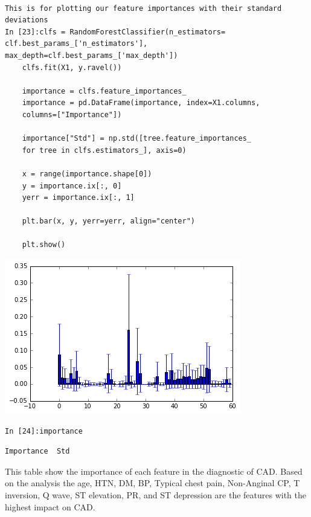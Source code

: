 \documentclass[sigconf]{acmart}
\begin{document}
\begin{lstlisting}

This is for plotting our feature importances with their standard deviations
In [23]:clfs = RandomForestClassifier(n_estimators= clf.best_params_['n_estimators'],
max_depth=clf.best_params_['max_depth'])
    clfs.fit(X1, y.ravel())

    importance = clfs.feature_importances_
    importance = pd.DataFrame(importance, index=X1.columns, 
    columns=["Importance"])

    importance["Std"] = np.std([tree.feature_importances_
    for tree in clfs.estimators_], axis=0)

    x = range(importance.shape[0])
    y = importance.ix[:, 0]
    yerr = importance.ix[:, 1]

    plt.bar(x, y, yerr=yerr, align="center")

    plt.show()
\end{lstlisting}
\includegraphics[width=0.95\columnwidth]{images/output_17_0.png}

\begin{lstlisting}
In [24]:importance
\end{lstlisting}



\begin{lstlisting}
Importance	Std
\end{lstlisting}


This table show the importance of each feature in the diagnostic of CAD. Based on the analysis the age, HTN,  DM, BP, Typical chest pain, Non-Anginal  CP, T  inversion, Q  wave,  ST elevation, PR, and ST depression are the features with the highest impact on CAD.
\end{document}

